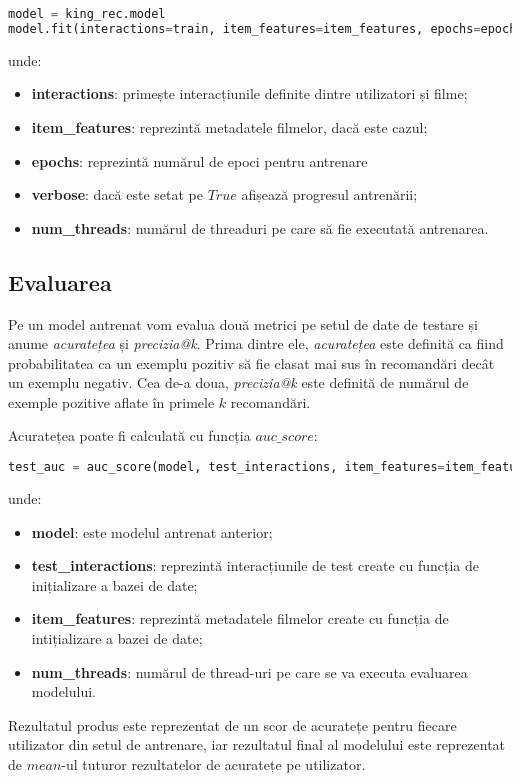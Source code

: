 \begin{lstlisting}[language=Python, caption=Antrenarea modelului]
model = king_rec.model
model.fit(interactions=train, item_features=item_features, epochs=epochs, verbose=True, num_threads=threads)
\end{lstlisting}
unde:
\begin{itemize}
	\item \textbf{interactions}: primește interacțiunile definite dintre utilizatori și filme;
	\item \textbf{item\_features}: reprezintă metadatele filmelor, dacă este cazul;
	\item \textbf{epochs}: reprezintă numărul de epoci pentru antrenare
	\item \textbf{verbose}: dacă este setat pe $True$ afișează progresul antrenării;
	\item \textbf{num\_threads}: numărul de threaduri pe care să fie executată antrenarea.
\end{itemize}

\subsection{Evaluarea}
Pe un model antrenat vom evalua două metrici pe setul de date de testare și anume \textit{acuratețea} și \textit{precizia@k}.
Prima dintre ele, \textit{acuratețea} este definită ca fiind probabilitatea ca un exemplu pozitiv să fie clasat mai sus în recomandări decât un exemplu negativ. Cea de-a doua, \textit{precizia@k} este definită de numărul de exemple pozitive aflate în primele $k$ recomandări.

Acuratețea poate fi calculată cu funcția $auc\_score$:
\begin{lstlisting}[language=Python, caption=Acuratețea unui model]
test_auc = auc_score(model, test_interactions, item_features=item_features, num_threads=threads).mean()
\end{lstlisting}
unde:
\begin{itemize}
	\item \textbf{model}: este modelul antrenat anterior;
	\item \textbf{test\_interactions}: reprezintă interacțiunile de test create cu funcția de inițializare a bazei de date;
	\item \textbf{item\_features}: reprezintă metadatele filmelor create cu funcția de intițializare a bazei de date;
	\item \textbf{num\_threads}: numărul de thread-uri pe care se va executa evaluarea modelului.
\end{itemize}
Rezultatul produs este reprezentat de un scor de acuratețe pentru fiecare utilizator din setul de antrenare, iar rezultatul final al modelului este reprezentat de $mean$-ul tuturor rezultatelor de acuratețe pe utilizator.

